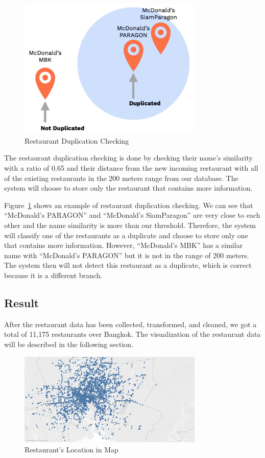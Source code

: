 \documentclass[12pt,oneside,openright,a4paper]{cpe-english-project}
\begin{document}
\newpage
\begin{figure}[H]\centering
\includegraphics[width=250pt]{./images/4RestaurantDuplicationChecking.png}
\caption{Restaurant Duplication Checking}\label{fig:4RestaurantDuplicationChecking}
\end{figure}

The restaurant duplication checking is done by checking their name’s similarity with a ratio of 0.65 and their distance from the new incoming restaurant with all of the existing restaurants in the 200 meters range from our database. The system will choose to store only the restaurant that contains more information.

Figure~\ref{fig:4RestaurantDuplicationChecking} shows an example of restaurant duplication checking. We can see that “McDonald’s PARAGON” and “McDonald’s SiamParagon” are very close to each other and the name similarity is more than our threshold. Therefore, the system will classify one of the restaurants as a duplicate and choose to store only one that contains more information. However, “McDonald’s MBK” has a similar name with “McDonald’s PARAGON” but it is not in the range of 200 meters. The system then will not detect this restaurant as a duplicate, which is correct because it is a different branch.

\subsection{Result}

After the restaurant data has been collected, transformed, and cleaned, we got a total of 11,175 restaurants over Bangkok. The visualization of the restaurant data will be described in the following section.

\begin{figure}[H]\centering
\includegraphics[width=250pt]{./images/4RestaurantsLocationinMap.png}
\caption{Restaurant’s Location in Map}\label{fig:4RestaurantsLocationinMap}
\end{figure}
\end{document}
